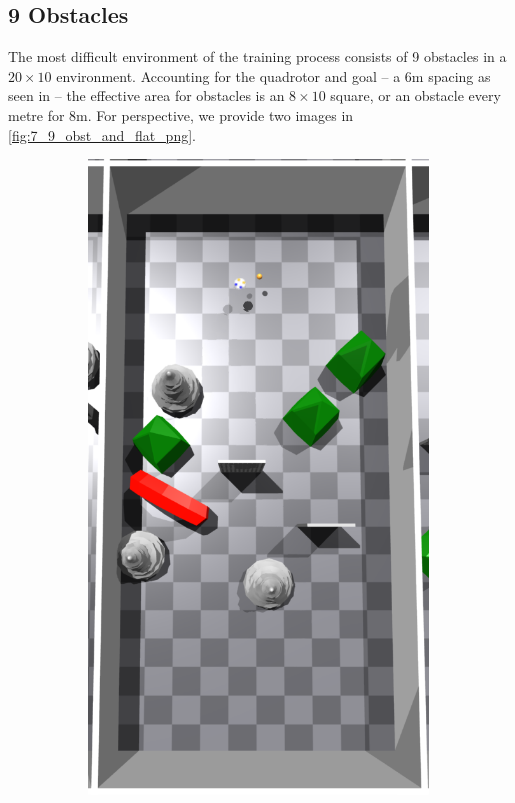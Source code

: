\subsection{9 Obstacles}
\label{subsec:7_9_obstacles}
The most difficult environment of the training process consists of 9 obstacles in a $20\times10$ environment. Accounting for the quadrotor and goal -- a 6m spacing as seen in  -- the effective area for obstacles is an $8\times10$ square, or an obstacle every metre for 8m. 
For perspective, we provide two images in \cref{fig:7_9_obst_and_flat_png}. 
\begin{figure}[htb]
    \centering
    \begin{subfigure}[b]{0.26\textwidth}
        \centering
        \captionsetup{justification=centering}
        \includegraphics[width=0.99\textwidth]{figures/7_/7_9_obst.png}

\end{subfigure}
\end{figure}
